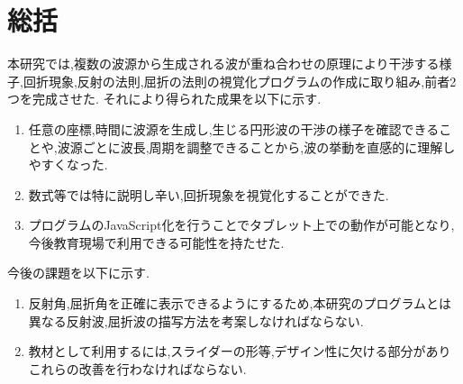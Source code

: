 \chapter{総括}
本研究では,複数の波源から生成される波が重ね合わせの原理により干渉する様子,回折現象,反射の法則,屈折の法則の視覚化プログラムの作成に取り組み,前者2つを完成させた.
それにより得られた成果を以下に示す.
\begin{enumerate}
  \item 任意の座標,時間に波源を生成し,生じる円形波の干渉の様子を確認できることや,波源ごとに波長,周期を調整できることから,波の挙動を直感的に理解しやすくなった.
  \item 数式等では特に説明し辛い,回折現象を視覚化することができた.
  \item プログラムのJavaScript化を行うことでタブレット上での動作が可能となり,今後教育現場で利用できる可能性を持たせた.
\end{enumerate}

今後の課題を以下に示す.
\begin{enumerate}
\item 反射角,屈折角を正確に表示できるようにするため,本研究のプログラムとは異なる反射波,屈折波の描写方法を考案しなければならない.
\item 教材として利用するには,スライダーの形等,デザイン性に欠ける部分がありこれらの改善を行わなければならない.
\end{enumerate}



